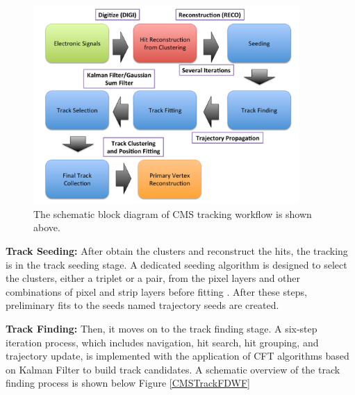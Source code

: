 \begin{figure}[hbtp]
\begin{center}
\includegraphics[width=0.90\textwidth]{Figures/Chapter3/TrackWF.pdf}
\caption{The schematic block diagram of CMS tracking workflow is shown above.}
\label{TrackWorkFlow}
\end{center}
\end{figure} 



\textbf{Track Seeding:} After obtain the clusters and reconstruct the hits, the tracking is in the track seeding stage. A dedicated seeding algorithm is designed to select the clusters, either a triplet or a pair, from the pixel layers and other combinations of pixel and strip layers before fitting \cite{CMSTrackComp}. After these steps, preliminary fits to the seeds named trajectory seeds are created.


\textbf{Track Finding:} Then, it moves on to the track finding stage. A six-step iteration process, which includes navigation, hit search, hit grouping, and trajectory update, is implemented with the application of CFT algorithms based on Kalman Filter to build track candidates. A schematic overview of the track finding process is shown below Figure \ref{CMSTrackFDWF}

